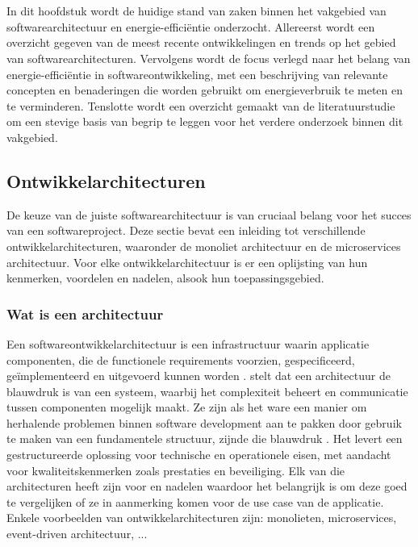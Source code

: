 \chapter{}%
\label{ch:stand-van-zaken}
In dit hoofdstuk wordt de huidige stand van zaken binnen het vakgebied van softwarearchitectuur en energie-efficiëntie onderzocht. Allereerst wordt een overzicht gegeven van de meest recente ontwikkelingen en trends op het gebied van softwarearchitecturen. Vervolgens wordt de focus verlegd naar het belang van energie-efficiëntie in softwareontwikkeling, met een beschrijving van relevante concepten en benaderingen die worden gebruikt om energieverbruik te meten en te verminderen. Tenslotte wordt een overzicht gemaakt van de literatuurstudie om een stevige basis van begrip te leggen voor het verdere onderzoek binnen dit vakgebied.


\section{Ontwikkelarchitecturen}
De keuze van de juiste softwarearchitectuur is van cruciaal belang voor het succes van een softwareproject. Deze sectie bevat een inleiding tot verschillende ontwikkelarchitecturen, waaronder de monoliet architectuur en de microservices architectuur. Voor elke ontwikkelarchitectuur is er een oplijsting van hun kenmerken, voordelen en nadelen, alsook hun toepassingsgebied. 

\subsection{Wat is een architectuur}
Een softwareontwikkelarchitectuur is een infrastructuur waarin applicatie componenten, die de functionele requirements voorzien, gespecificeerd, geïmplementeerd en uitgevoerd kunnen worden \autocite{Solms2012}. \textcite{Jaiswal2019} stelt dat een architectuur de blauwdruk is van een systeem, waarbij het complexiteit beheert en communicatie tussen componenten mogelijk maakt. Ze zijn als het ware een manier om herhalende problemen binnen software development aan te pakken door gebruik te maken van een fundamentele structuur, zijnde die blauwdruk \autocite{Dhaduk2020}.  Het levert een gestructureerde oplossing voor technische en operationele eisen, met aandacht voor kwaliteitskenmerken zoals prestaties en beveiliging. Elk van die architecturen heeft zijn voor en nadelen waardoor het belangrijk is om deze goed te vergelijken of ze in aanmerking komen voor de use case van de applicatie. Enkele voorbeelden van ontwikkelarchitecturen zijn: monolieten, microservices, event-driven architectuur, ...

